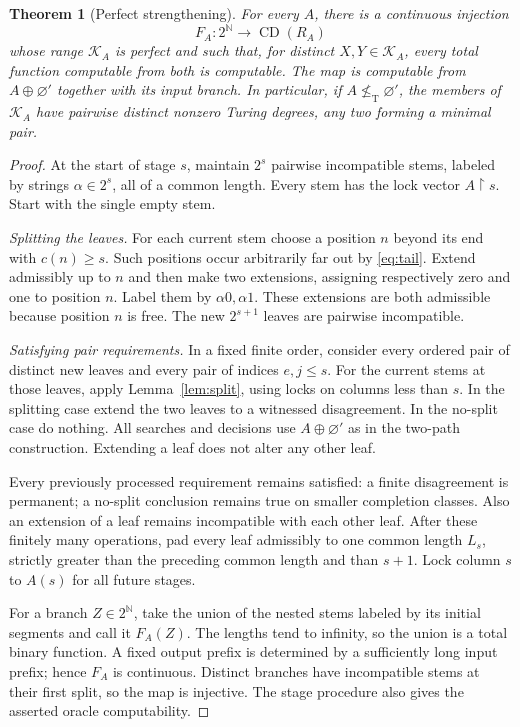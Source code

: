 \documentclass[11pt,a4paper]{article}
\newcommand{\N}{\mathbb N}
\newcommand{\nleT}{\nleq_{\mathrm T}}
\newcommand{\CD}{\operatorname{CD}}
\newcommand{\restr}{\mathbin{\upharpoonright}}
\newtheorem{theorem}{Theorem}[section]
\theoremstyle{definition}\newtheorem{definition}[theorem]{Definition}
\theoremstyle{remark}\newtheorem{remark}[theorem]{Remark}
\begin{document}
\begin{theorem}[Perfect strengthening]\label{thm:perfect}
For every $A$, there is a continuous injection
\[
 F_A:2^{\N}\longrightarrow\CD(R_A)
\]
whose range $\mathcal K_A$ is perfect and such that, for distinct $X,Y\in\mathcal K_A$, every total function computable from both is computable. The map is computable from $A\oplus\varnothing'$ together with its input branch. In particular, if $A\nleT\varnothing'$, the members of $\mathcal K_A$ have pairwise distinct nonzero Turing degrees, any two forming a minimal pair.
\end{theorem}
\begin{proof}
At the start of stage $s$, maintain $2^s$ pairwise incompatible stems, labeled by strings $\alpha\in2^s$, all of a common length. Every stem has the lock vector $A\restr s$. Start with the single empty stem.

\emph{Splitting the leaves.} For each current stem choose a position $n$ beyond its end with $c(n)\geq s$. Such positions occur arbitrarily far out by \eqref{eq:tail}. Extend admissibly up to $n$ and then make two extensions, assigning respectively zero and one to position $n$. Label them by $\alpha0,\alpha1$. These extensions are both admissible because position $n$ is free. The new $2^{s+1}$ leaves are pairwise incompatible.

\emph{Satisfying pair requirements.} In a fixed finite order, consider every ordered pair of distinct new leaves and every pair of indices $e,j\leq s$. For the current stems at those leaves, apply Lemma~\ref{lem:split}, using locks on columns less than $s$. In the splitting case extend the two leaves to a witnessed disagreement. In the no-split case do nothing. All searches and decisions use $A\oplus\varnothing'$ as in the two-path construction. Extending a leaf does not alter any other leaf.

Every previously processed requirement remains satisfied: a finite disagreement is permanent; a no-split conclusion remains true on smaller completion classes. Also an extension of a leaf remains incompatible with each other leaf. After these finitely many operations, pad every leaf admissibly to one common length $L_s$, strictly greater than the preceding common length and than $s+1$. Lock column $s$ to $A(s)$ for all future stages.

For a branch $Z\in2^{\N}$, take the union of the nested stems labeled by its initial segments and call it $F_A(Z)$. The lengths tend to infinity, so the union is a total binary function. A fixed output prefix is determined by a sufficiently long input prefix; hence $F_A$ is continuous. Distinct branches have incompatible stems at their first split, so the map is injective. The stage procedure also gives the asserted oracle computability.


\end{proof}
\end{document}
